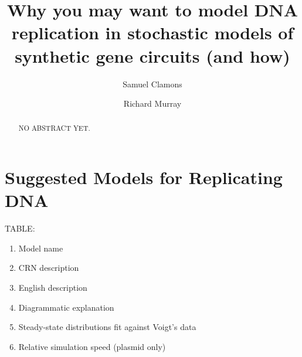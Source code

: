 \documentclass[preprint,12pt]{elsarticle}
\begin{document}
\begin{frontmatter}


\title{Why you may want to model DNA replication in stochastic models of synthetic gene circuits (and how)}




\author{Samuel Clamons}
\author{Richard Murray}

\address{Caltech, Pasadena, CA, United States}


\begin{abstract}
NO ABSTRACT YET.
\end{abstract}

\end{frontmatter}

\section{Suggested Models for Replicating DNA}

TABLE:
\begin{enumerate}
\item Model name
\item CRN description
\item English description
\item Diagrammatic explanation
\item Steady-state distributions fit against Voigt's data
\item Relative simulation speed (plasmid only)
\end{enumerate}

\end{document}

